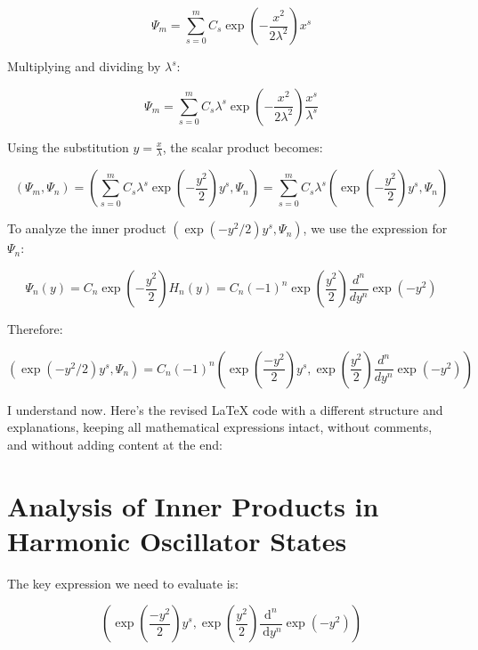\documentclass[italian]{HKNdocument}
\begin{document}
\begin{equation}
\Psi_m = \sum_{s=0}^m C_s\exp\left(-\frac{x^2}{2\lambda^2}\right)x^s \label{eq:5.65}
\end{equation}

Multiplying and dividing by $\lambda^s$:

\begin{equation}
\Psi_m = \sum_{s=0}^m C_s\lambda^s\exp\left(-\frac{x^2}{2\lambda^2}\right)\frac{x^s}{\lambda^s} \label{eq:5.66}
\end{equation}

Using the substitution $y = \frac{x}{\lambda}$, the scalar product becomes:

\begin{equation}
(\Psi_m, \Psi_n) = \left(\sum_{s=0}^m C_s\lambda^s\exp\left(-\frac{y^2}{2}\right)y^s, \Psi_n\right) = \sum_{s=0}^m C_s\lambda^s\left(\exp\left(-\frac{y^2}{2}\right)y^s, \Psi_n\right) \label{eq:5.67}
\end{equation}

To analyze the inner product $\left(\exp\left(-y^2/2\right)y^s, \Psi_n\right)$, we use the expression for $\Psi_n$:

\begin{equation}
\Psi_n(y) = C_n\exp\left(-\frac{y^2}{2}\right)H_n(y) = C_n(-1)^n\exp\left(\frac{y^2}{2}\right)\frac{d^n}{dy^n}\exp(-y^2) \label{eq:5.68}
\end{equation}

Therefore:

\begin{equation}
\left(\exp\left(-y^2/2\right)y^s, \Psi_n\right) = C_n(-1)^n\left(\exp\left(\frac{-y^2}{2}\right)y^s, \exp\left(\frac{y^2}{2}\right)\frac{d^n}{dy^n}\exp(-y^2)\right) \label{eq:5.69}
\end{equation}

I understand now. Here's the revised LaTeX code with a different structure and explanations, keeping all mathematical expressions intact, without comments, and without adding content at the end:


\section{Analysis of Inner Products in Harmonic Oscillator States}

The key expression we need to evaluate is:

\begin{equation}
\left(\exp \left(\frac{-y^{2}}{2}\right) y^{s}, \exp \left(\frac{y^{2}}{2}\right) \frac{\mathrm{d}^{n}}{\mathrm{~d} y^{n}} \exp \left(-y^{2}\right)\right) \label{eq:5.70}
\end{equation}
\end{document}
